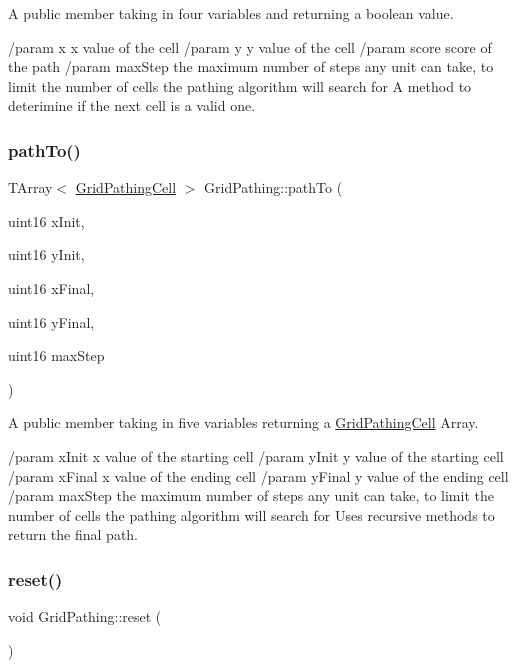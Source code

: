 A public member taking in four variables and returning a boolean value. 

/param x x value of the cell /param y y value of the cell /param score score of the path /param max\+Step the maximum number of steps any unit can take, to limit the number of cells the pathing algorithm will search for A method to deterimine if the next cell is a valid one. \hypertarget{class_grid_pathing_a34564759aeef0f39b6c596163530b51b}{}\label{class_grid_pathing_a34564759aeef0f39b6c596163530b51b} 
\subsubsection{\texorpdfstring{path\+To()}{pathTo()}}
{\footnotesize\ttfamily T\+Array$<$ \hyperlink{class_grid_pathing_cell}{Grid\+Pathing\+Cell} $>$ Grid\+Pathing\+::path\+To (\begin{DoxyParamCaption}\item[{uint16}]{x\+Init,  }\item[{uint16}]{y\+Init,  }\item[{uint16}]{x\+Final,  }\item[{uint16}]{y\+Final,  }\item[{uint16}]{max\+Step }\end{DoxyParamCaption})}



A public member taking in five variables returning a \hyperlink{class_grid_pathing_cell}{Grid\+Pathing\+Cell} Array. 

/param x\+Init x value of the starting cell /param y\+Init y value of the starting cell /param x\+Final x value of the ending cell /param y\+Final y value of the ending cell /param max\+Step the maximum number of steps any unit can take, to limit the number of cells the pathing algorithm will search for Uses recursive methods to return the final path. \hypertarget{class_grid_pathing_aa4ce89d949c8d42bf2d4eb9d77e865a8}{}\label{class_grid_pathing_aa4ce89d949c8d42bf2d4eb9d77e865a8} 
\subsubsection{\texorpdfstring{reset()}{reset()}}
{\footnotesize\ttfamily void Grid\+Pathing\+::reset (\begin{DoxyParamCaption}{ }\end{DoxyParamCaption})}



